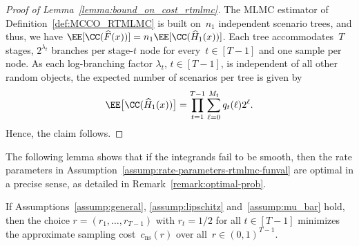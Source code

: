 \documentclass[11pt]{article}
\let\hat\widehat
\begin{document}
\begin{proof}[Proof of Lemma~\ref{lemma:bound_on_cost_rtmlmc}] 

The MLMC estimator of Definition~\ref{def:MCCO_RTMLMC} is built on~$n_1$ independent scenario trees, and thus, we have $\EE[\CC(\hat{F}(x))]=n_1\EE[\CC(\hat{H}_{1}(x))]$. Each tree accommodates~$T$ stages, $2^{\lambda_t}$ branches per stage-$t$ node for every~$t\in[T-1]$ and one sample per node. As each log-branching factor $\lambda_t$, $t\in[T-1]$, is independent of all other random objects, the expected number of scenarios per tree is given by
\begin{align*}
   \EE\big[\CC(\hat{H}_{1}(x))\big] =  \prod_{t=1}^{T-1}\sum_{\ell=0}^{M_t} q_t(\ell)2^{\ell}.
\end{align*}
Hence, the claim follows. 
\end{proof}


The following lemma shows that if the integrands fail to be smooth, then the rate parameters in Assumption~\ref{assump:rate-parameters-rtmlmc-funval} are optimal in a precise sense, as detailed in Remark~\ref{remark:optimal-prob}.

\begin{lemma}\label{lemma:optimal_b}
    If Assumptions~\ref{assump:general}, \ref{assump:lipschitz} and~\ref{assump:mu_bar} hold, then the choice $r = (r_1, \ldots, r_{T-1})$ with $r_t = 1/2$ for all $t \in [T-1]$ minimizes the approximate sampling cost~$c_{\mathrm{ns}}(r)$ over all~$r\in(0, 1)^{T-1}$.
\end{lemma}
\end{document}
